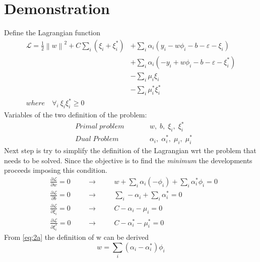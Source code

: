 \documentclass{article}
\newcommand{\norm}[1]{\left\lVert#1\right\rVert}
\newcommand{\Lagr}{\mathcal{L}}
\begin{document}
\section{Demonstration}
Define the Lagrangian function
\begin{equation}\label{eq:1}
    \begin{aligned}
        \Lagr = \frac{1}{2} \norm{w}^2 + C \sum_i (\xi_i + \xi_i^*) &+\sum_i \alpha_i (y_i - w\phi_i -b - \varepsilon - \xi_i) \\
        &+\sum_i \alpha_i (-y_i + w\phi_i -b - \varepsilon - \xi_i^*) \\
        &-\sum_i \mu_i\xi_i \\
        &-\sum_i \mu_i^*\xi_i^* \\
        where \quad \forall_i \: \xi_i\xi_i^* \geq 0
    \end{aligned}
\end{equation}
Variables of the two definition of the problem:
\begin{equation*}
    \begin{aligned}
            &Primal \; problem \qquad && w, \; b, \; \xi_i, \; \xi_i^* \\
            &Dual \; Problem && \alpha_i, \; \alpha_i^*, \; \mu_i, \; \mu_i^*
    \end{aligned}
\end{equation*}
Next step is try to simplify the definition of the Lagrangian wrt the problem that needs to be solved. Since the objective is to find the \textit{minimum} the developments proceeds imposing this condition.
\begin{subequations}
    \begin{align}
        &\frac {\partial \Lagr}{\partial w} = 0 \quad &&\longrightarrow \quad && w + \sum_i \alpha_i(-\phi_i) + \sum_i \alpha_i^*\phi_i = 0 \label{eq:2a}\\
        &\frac {\partial \Lagr}{\partial b} = 0 &&\longrightarrow && \sum_i -\alpha_i + \sum_i \alpha_i^* = 0 \label{eq:2b}\\
        &\frac {\partial \Lagr}{\partial \xi_i} = 0 &&\longrightarrow && C - \alpha_i - \mu_i = 0 \label{eq:2c}\\
        &\frac {\partial \Lagr}{\partial \xi_i^*} = 0 &&\longrightarrow && C - \alpha_i^* - \mu_i^* = 0 \label{eq:2d}
    \end{align}
\end{subequations}
From \eqref{eq:2a} the definition of w can be derived
\begin{equation}\label{eq:3}
    w = \sum_i (\alpha_i - \alpha_i^*)\phi_i
\end{equation}
\end{document}
